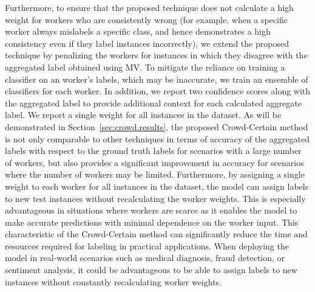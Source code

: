\documentclass[sn-nature]{bst/sn-jnl}
\begin{document}
Furthermore, to ensure that the proposed technique does not calculate a high weight for workers who are consistently wrong (for example, when a specific worker always mislabels a specific class, and hence demonstrates a high consistency even if they label instances incorrectly), we extend the proposed technique by penalizing the workers for instances in which they disagree with the aggregated label obtained using MV. To mitigate the reliance on training a classifier on an worker's labels, which may be inaccurate, we train an ensemble of classifiers for each worker. In addition, we report two confidence scores along with the aggregated label to provide additional context for each calculated aggregate label. We report a single weight for all instances in the dataset. As will be demonstrated in Section~\ref{sec:crowd.results}, the proposed Crowd-Certain method is not only comparable to other techniques in terms of accuracy of the aggregated labels with respect to the ground truth labels for scenarios with a large number of workers, but also provides a significant improvement in accuracy for scenarios where the number of workers may be limited. Furthermore, by assigning a single weight to each worker for all instances in the dataset, the model can assign labels to new test instances without recalculating the worker weights. This is especially advantageous in situations where workers are scarce as it enables the model to make accurate predictions with minimal dependence on the worker input. This characteristic of the Crowd-Certain method can significantly reduce the time and resources required for labeling in practical applications. When deploying the model in real-world scenarios such as medical diagnosis, fraud detection, or sentiment analysis, it could be advantageous to be able to assign labels to new instances without constantly recalculating worker weights.
\end{document}
